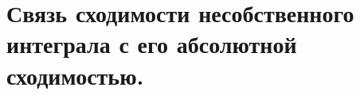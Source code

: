 \documentclass[../main.tex]{subfiles}
\begin{document}
\newpage
\section{Связь сходимости несобственного интеграла с его абсолютной сходимостью.}
\end{document}
